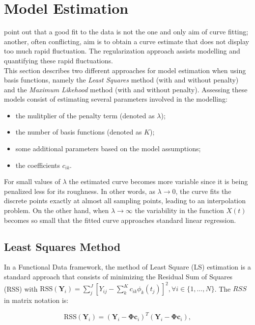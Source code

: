 \section{Model Estimation}\label{model_est}
\cite{GreenSilverma1994} point out that a good fit to the data is not the one and only aim of curve fitting; another, often conflicting, aim is to obtain a curve estimate that does not display too much rapid fluctuation. The regularization approach assists modelling and quantifying these rapid fluctuations.\\
This section describes two different approaches for model estimation when using basis functions, namely the \textit{Least Squares} method (with and without penalty) and the \textit{Maximum Likehood} method (with and without penalty). Assessing these models consist of estimating several parameters involved in the modelling:
\begin{itemize}
\item the mulitplier of the penalty term (denoted as $\lambda$);
\item the number of basis functions (denoted as $K$);
\item some additional parameters based on the model assumptions;
\item the coefficients $c_{ik}$.
\end{itemize}
For small values of $\lambda$ the estimated curve becomes more variable since it is being penalized less for its roughness. In other words, as $\lambda \rightarrow 0$, the curve fits the discrete points exactly at almost all sampling points, leading to an interpolation problem. On the other hand, when $\lambda \rightarrow \infty$ the variability in the function $X(t)$ becomes so small that the fitted curve approaches standard linear regression.
\clearpage
\subsection{Least Squares Method}
In a Functional Data framework, the method of Least Square (LS) estimation is a standard approach that consists of minimizing the Residual Sum of Squares (RSS) with $\text{RSS}(\bm{Y}_i)=\sum_{j}^{J}\left[Y_{ij}-\sum\limits_{k}^{K}c_{ik}\phi_{k}(t_{j})\right]^{2}, \forall i \in \{1,\dots,N\}$. The $RSS$ in matrix notation is:

\begin{equation}\label{eq:leastsqpen1}
\text{RSS}(\mathbf{Y}_i)=\left(\mathbf{Y}_i-\mathbf{\Phi}\mathbf{c}_i\right)^T\left(\mathbf{Y}_i-\mathbf{\Phi}\mathbf{c}_i\right),
\end{equation}

